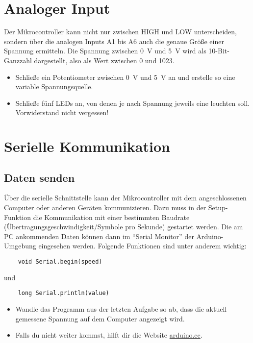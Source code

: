 \documentclass[10pt,a4paper]{article}
\begin{document}
\section{Analoger Input}
Der Mikrocontroller kann nicht nur zwischen HIGH und LOW unterscheiden, sondern über die analogen Inputs A1 bis A6 auch die genaue Größe einer Spannung ermitteln. Die Spannung zwischen \SI{0}{V} und \SI{5}{V} wird als 10-Bit-Ganzzahl dargestellt, also als Wert zwischen 0 und 1023.

\begin{itemize}
	\item Schließe ein Potentiometer zwischen \SI{0}{V} und \SI{5}{V} an und erstelle so eine variable Spannungsquelle.
	\item Schließe fünf LEDs an, von denen je nach Spannung jeweils eine leuchten soll. Vorwiderstand nicht vergessen!
\end{itemize}





\section{Serielle Kommunikation}
\subsection{Daten senden}
Über die serielle Schnittstelle kann der Mikrocontroller mit dem angeschlossenen Computer oder anderen Geräten kommunizieren. Dazu muss in der Setup-Funktion die Kommunikation mit einer bestimmten Baudrate (Übertragungsgeschwindigkeit/Symbole pro Sekunde) gestartet werden. Die am PC ankommenden Daten können dann im "`Serial Monitor"' der Arduino-Umgebung eingesehen werden. Folgende Funktionen sind unter anderem wichtig:

\begin{lstlisting}
	void Serial.begin(speed)
\end{lstlisting}
und
\begin{lstlisting}
	long Serial.println(value)
\end{lstlisting}

\begin{itemize}
	\item Wandle das Programm aus der letzten Aufgabe so ab, dass die aktuell gemessene Spannung auf dem Computer angezeigt wird.
	\item Falls du nicht weiter kommst, hilft dir die Website \href{https://www.arduino.cc/reference/de/language/functions/communication/serial/}{arduino.cc}.
\end{itemize}
\end{document}
